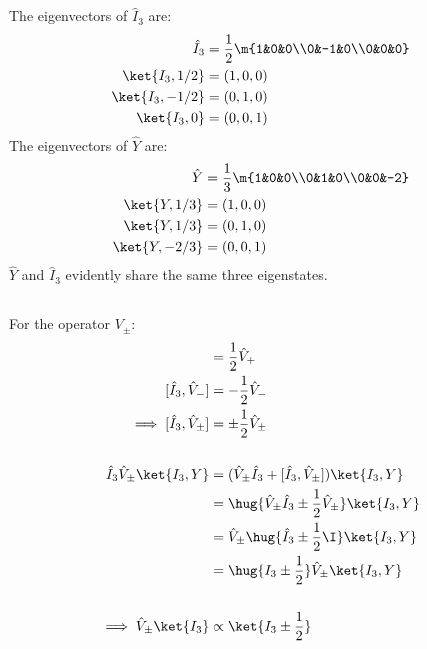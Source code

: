 \documentclass[exb,en]{exercise_5.0}
\begin{document}
\subsection{}
The eigenvectors of $\hat I_3$ are:
\begin{align*}
    \hat I_3 &= \frac12\m{1&0&0\\0&-1&0\\0&0&0}\\
    \ket{ I_3,1/2} &= (1,0,0)\\
    \ket{ I_3,-1/2} &= (0,1,0)\\
    \ket{ I_3,0} &= (0,0,1)
\end{align*}
The eigenvectors of $\hat Y$ are:
\begin{align*}
    \hat Y &= \frac1{3} \m{1&0&0\\0&1&0\\0&0&-2}\\
    \ket{Y,1/3} &= (1,0,0)\\
    \ket{Y,1/3} &= (0,1,0)\\
    \ket{Y,-2/3 } &= (0,0,1)
\end{align*}
$\hat Y$ and $\hat I_3$ evidently share the same three eigenstates.

\subsection{}
For the operator $V_\pm$:
\begin{align*}
    [\hat I_3, \hat V _+] &= \frac12 \hat V_+\\
    [\hat I_3, \hat V _-] &= -\frac12 \hat V_-\\
    \implies [\hat I_3, \hat V_\pm] &= \pm \frac12 \hat V_\pm\\ 
    \\
    \hat I_3 \hat V_\pm \ket{I_3, Y} 
    &= (\hat V_\pm\hat I_3  + [\hat I_3, \hat V_\pm]) \ket{I_3, Y} \\
    &= \hug{\hat V_\pm\hat I_3  \pm \frac12 \hat V_\pm} \ket{I_3, Y} \\
    &= \hat V_\pm\hug{\hat I_3  \pm \frac12 \I} \ket{I_3, Y} \\
    &= \hug{I_3 \pm \frac12}\hat V_\pm \ket{I_3, Y} \\
    \\
    \implies \hat V_\pm\ket{I_3} &\propto \ket{I_3\pm\frac12}
\end{align*}
\end{document}
